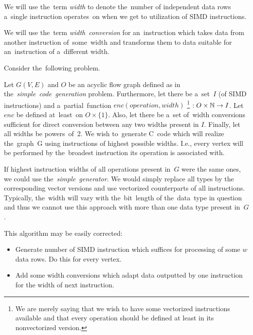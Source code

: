 \begin{define}
We will use the~term \emph{width} to denote the~number of independent data rows a~single instruction operates~on when we get to utilization of SIMD instructions.
\end{define}

\begin{define}
  We will use the~term \emph{width~conversion} for an~instruction which takes data from another instruction of~some~width and transforms them to data suitable for an~instruction of a~different width. 
\end{define}

Consider the~following problem.

\begin{problem}
  Let $G(V,E)$ and $O$ be an acyclic flow graph defined as in the~\emph{simple~code~generation} problem. Furthermore, let there be a~set~$I$ (of SIMD instructions) and a~partial~function $enc (operation, width)$ \footnote{We are merely saying that we wish to have some vectorized instructions available and that every operation should be defined at least in its nonvectorized version.} $: O \times \mathbb{N} \rightarrow I$. Let $enc$ be defined at~least~on $O \times \{1\}$. Also, let there be a~set of~width conversions sufficient for direct conversion between any two widths present in $I$. Finally, let all widths be powers~of~2. We wish to~generate C~code which will realize the~graph~G using instructions of highest possible widths. I.e., every vertex will be performed by the~broadest instruction its operation is associated with. 
\end{problem}

If highest instruction widths of all operations present in~$G$ were the same ones, we could use the~\emph{simple~generator}. We would simply replace all types by the corresponding vector versions and use vectorized counterparts of all instructions. Typically, the~width will vary with the~bit~length of the~data~type in question and thus we cannot use this approach with more than one data type present in~$G$.


This algorithm may be easily corrected:
\begin{itemize}
  \item Generate number of SIMD instruction which suffices for processing of some $w$ data rows. Do this for every vertex.
  \item Add some width conversions which adapt data outputted by one instruction for the width of next instruction.
\end{itemize}

